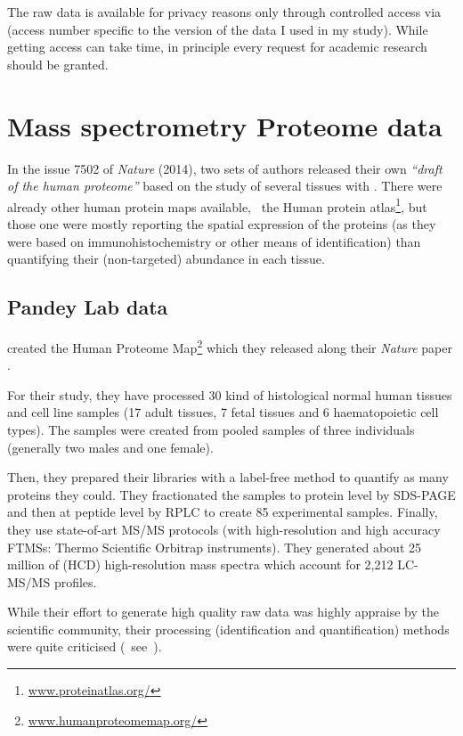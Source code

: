 The raw data is available for privacy reasons only through controlled access via
 (access number specific to the version of the data I used
in my study). While getting access can take time, in principle every request for
academic research should be granted.

\section{Mass spectrometry Proteome data}

In the issue 7502 of \textit{Nature} (2014), two sets of authors released their
own \emph{``draft of the human proteome''} based on the study of several tissues
with \ms. There were already other human protein maps available,
\eg\ the Human protein atlas\footnote{%
\href{http://www.humanproteomemap.org/}{www.proteinatlas.org/}}, but those one
were mostly reporting the spatial expression of the proteins (as they were based
on immunohistochemistry or other means of identification) than
quantifying their (non-targeted) abundance in each tissue.


\subsection{Pandey Lab data}

\cite{PandeyData} created the Human Proteome Map\footnote{%
\href{http://www.humanproteomemap.org/}{\small www.humanproteomemap.org/}} which
they released along their \emph{Nature} paper .

For their study, they have processed 30 kind of histological normal human
tissues and cell line samples (17 adult tissues, 7 fetal tissues and 6
haematopoietic cell types). The samples were created from pooled samples of three
individuals (generally two males and one female).

Then, they prepared their libraries with a label-free method to quantify
as many proteins they could. They fractionated the samples to protein level by
\gls{SDS-PAGE} and then at peptide level by \gls{RPLC} to create 85 experimental
samples. Finally, they use state-of-art \gls{MS/MS} protocols
(with high-resolution and high accuracy \glspl{FTMS}:
Thermo Scientific Orbitrap instruments).
They generated about 25 million of (\gls{HCD})
high-resolution mass spectra which account for 2,212 \gls{LC-MS/MS} profiles.

While their effort to generate high quality raw data was highly appraise
by the scientific community, their processing
(identification and quantification) methods were
quite criticised (\eg\ see~\cite{Ezkurdia2014-qx}).

